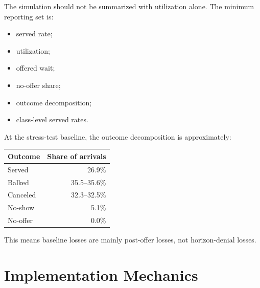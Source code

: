 \documentclass[11pt]{article}
\begin{document}
The simulation should not be summarized with utilization alone. The minimum
reporting set is:

\begin{itemize}
  \item served rate;
  \item utilization;
  \item offered wait;
  \item no-offer share;
  \item outcome decomposition;
  \item class-level served rates.
\end{itemize}

At the stress-test baseline, the outcome decomposition is approximately:

\begin{center}
\begin{tabular}{lr}
\toprule
Outcome & Share of arrivals \\
\midrule
Served & 26.9\% \\
Balked & 35.5--35.6\% \\
Canceled & 32.3--32.5\% \\
No-show & 5.1\% \\
No-offer & 0.0\% \\
\bottomrule
\end{tabular}
\end{center}

This means baseline losses are mainly post-offer losses, not horizon-denial
losses.

\section*{Implementation Mechanics}
\end{document}
